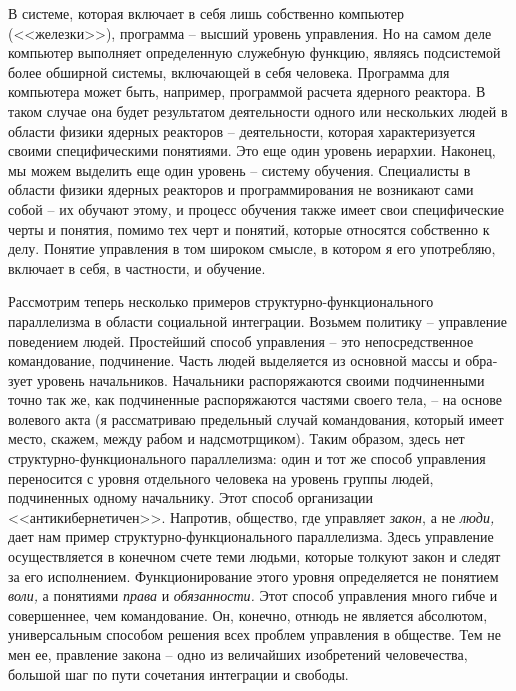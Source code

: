 \documentclass{book}
\begin{document}
В системе, которая включает в себя лишь собственно компьютер (<<железки>>), программа -- высший уровень управления. Но на самом деле компьютер выполняет определенную служебную функцию, являясь подсистемой более обширной системы, включающей в себя человека. Программа для компьютера может быть, например, программой расчета ядерного реактора. В таком случае она будет результатом деятельности одного или нескольких людей в области физики ядерных реакторов -- деятельности, которая характеризуется своими спе­цифическими понятиями. Это еще один уровень иерархии. На­конец, мы можем выделить еще один уровень -- систему обу­чения. Специалисты в области физики ядерных реакторов и про­граммирования не возникают сами собой -- их обучают этому, и процесс обучения также имеет свои специфические черты и понятия, помимо тех черт и понятий, которые относятся собст­венно к делу. Понятие управления в том широком смысле, в котором я его употребляю, включает в себя, в частности, и обучение.

Рассмотрим теперь несколько примеров структурно-функ­ционального параллелизма в области социальной интеграции. Возьмем политику -- управление поведением людей. Прос\-тей\-­ший способ управления -- это непосредственное командование, подчинение. Часть людей выделяется из основной массы и обра­зует уровень начальников. Начальники распоряжаются своими подчиненными точно так же, как подчиненные распоряжаются частями своего тела, -- на основе волевого акта (я рассматри­ваю предельный случай командования, который имеет место, скажем, между рабом и надсмотрщиком). Таким образом, здесь нет структурно-функционального параллелизма: один и тот же способ управления переносится с уровня отдельного че­ловека на уровень группы людей, подчиненных одному началь­нику. Этот способ организации <<антикибернетичен>>. Напротив, общество, где управляет \textit{закон},  а не \textit{люди,}  дает нам пример структурно-функционального параллелизма. Здесь управление осуществляется в конечном счете теми людьми, которые тол­куют закон и следят за его 
исполнением. Функционирование этого уровня определяется не понятием \textit{воли,}  а понятиями \textit{права}  и \textit{обязанности.}  Этот способ управления много гибче и совер­шеннее, чем командование. Он, конечно, отнюдь не является абсолютом, универсальным способом решения всех проблем управления в обществе. Тем не мен ее, правление закона -- одно из величайших изобретений человечества, большой шаг по пу­ти сочетания интеграции и свободы.
\end{document}
